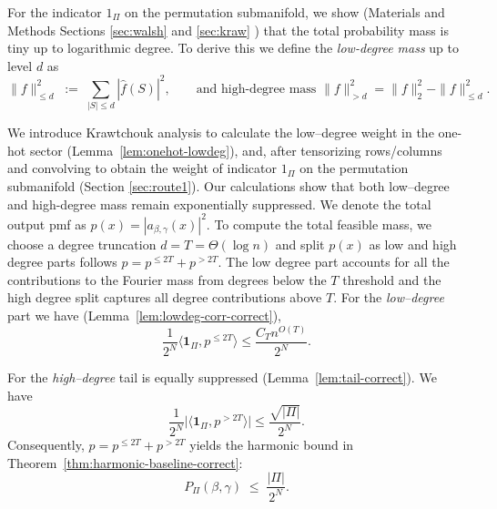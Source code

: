 \documentclass[a4paper,onecolumn,11pt,unpublished]{quantumarticle}
\theoremstyle{remark}
\begin{document}
For the indicator $1_\Pi$ on the permutation submanifold, we show (Materials and Methods Sections \ref{sec:walsh} and \ref{sec:kraw} ) that the total probability mass is tiny up to logarithmic degree. To derive this we define the \emph{low-degree mass} up to level $d$ as
\[
\|f\|^2_{\le d}\;:=\;\sum_{|S|\le d}\!|\widehat f(S)|^2,
\qquad
\text{and high-degree mass } \|f\|^2_{> d}= \|f\|_2^2-\|f\|^2_{\le d}.
\]

\medskip
\noindent
We introduce Krawtchouk analysis to calculate the low–degree weight in the one-hot sector (Lemma~\ref{lem:onehot-lowdeg}), and, after tensorizing rows/columns and convolving to obtain the weight of indicator $1_\Pi$ on the permutation submanifold (Section \ref{sec:route1}). Our calculations show that both low–degree and high-degree mass remain exponentially suppressed. We denote the total output pmf as $p(x)=|a_{\beta,\gamma}(x)|^2$.  To compute the total feasible mass, we choose a degree truncation  $d=T=\Theta(\log n)$ and split $p(x)$ as low and high degree parts follows $p=p^{\le 2T}+p^{>2T}$. The low degree part accounts for all the contributions to the Fourier mass from degrees below the $T$ threshold and the high degree split captures all degree contributions above $T$. For the \emph{low–degree} part we have (Lemma~\ref{lem:lowdeg-corr-correct}),
\[
\frac{1}{2^N}\langle \mathbf{1}_\Pi, p^{\le 2T}\rangle
\le 
\frac{C_T n^{O(T)}}{2^{N}}.
\]




  
For the \emph{high–degree} tail is equally suppressed (Lemma~\ref{lem:tail-correct}). We have 
\[
\frac{1}{2^N}\big|\langle \mathbf{1}_\Pi, p^{>2T}\rangle\big|
\le \frac{\sqrt{|\Pi|}}{2^N}.
\]
Consequently, $p=p^{\le 2T}+p^{>2T}$ yields the harmonic bound in Theorem~\ref{thm:harmonic-baseline-correct}:
\[
P_\Pi(\beta,\gamma)\;\le\;\frac{|\Pi|}{2^N}.
\]
\end{document}
